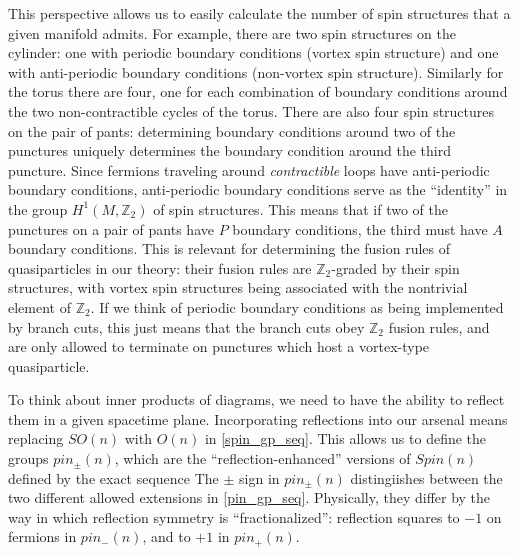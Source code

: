 \documentclass[12pt,a4paper]{article}
\newcommand{\zt}{\mathbb{Z}_2}
\begin{document}
This perspective allows us to easily calculate the number of spin structures that a given manifold admits. For example, there are two spin structures on the cylinder: one with periodic boundary conditions (vortex spin structure) and one with anti-periodic boundary conditions (non-vortex spin structure). Similarly for the torus there are four, one for each combination of boundary conditions around the two non-contractible cycles of the torus. There are also four spin structures on the pair of pants: determining boundary conditions around two of the punctures uniquely determines the boundary condition around the third puncture. Since fermions traveling around {\it contractible} loops have anti-periodic boundary conditions, anti-periodic boundary conditions serve as the ``identity'' in the group $H^1(M,\zt)$ of spin structures. This means that if two of the punctures on a pair of pants have $P$ boundary conditions, the third must have $A$ boundary conditions. This is relevant for determining the fusion rules of quasiparticles in our theory: their fusion rules are $\zt$-graded by their spin structures, with vortex spin structures being associated with the nontrivial element of $\zt$. If we think of periodic boundary conditions as being implemented by branch cuts, this just means that the branch cuts obey $\zt$ fusion rules, and are only allowed to terminate on punctures which host a vortex-type quasiparticle. 


To think about inner products of diagrams, we need to have the ability to reflect them in a given spacetime plane. Incorporating reflections into our arsenal means replacing $SO(n)$ with $O(n)$ in \eqref{spin_gp_seq}. This allows us to define the groups $pin_\pm(n)$, which are the ``reflection-enhanced'' versions of $Spin(n)$ defined by the exact sequence 
 The $\pm$ sign in $pin_\pm(n)$ distingiishes between the two different allowed extensions in \eqref{pin_gp_seq}. Physically, they differ by the way in which reflection symmetry is ``fractionalized'': reflection squares to $-1$ on fermions in $pin_-(n)$, and to $+1$ in $pin_+(n)$. 
\end{document}
